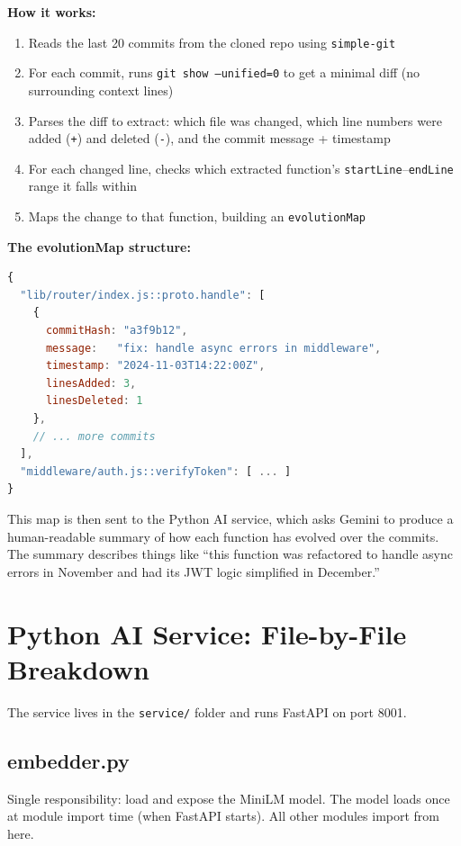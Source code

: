 \documentclass[a4paper,11pt]{article}
\begin{document}
\textbf{How it works:}
\begin{enumerate}
    \item Reads the last 20 commits from the cloned repo using \texttt{simple-git}
    \item For each commit, runs \texttt{git show --unified=0} to get a minimal diff (no surrounding context lines)
    \item Parses the diff to extract: which file was changed, which line numbers were added (\texttt{+}) and deleted (\texttt{-}), and the commit message + timestamp
    \item For each changed line, checks which extracted function's \texttt{startLine}--\texttt{endLine} range it falls within
    \item Maps the change to that function, building an \texttt{evolutionMap}
\end{enumerate}

\textbf{The evolutionMap structure:}
\begin{lstlisting}[language=JavaScript]
{
  "lib/router/index.js::proto.handle": [
    {
      commitHash: "a3f9b12",
      message:   "fix: handle async errors in middleware",
      timestamp: "2024-11-03T14:22:00Z",
      linesAdded: 3,
      linesDeleted: 1
    },
    // ... more commits
  ],
  "middleware/auth.js::verifyToken": [ ... ]
}
\end{lstlisting}

This map is then sent to the Python AI service, which asks Gemini to produce a human-readable summary of how each function has evolved over the commits. The summary describes things like ``this function was refactored to handle async errors in November and had its JWT logic simplified in December.''

\newpage

\section{Python AI Service: File-by-File Breakdown}

The service lives in the \texttt{service/} folder and runs FastAPI on port 8001.

\subsection{embedder.py}
Single responsibility: load and expose the MiniLM model. The model loads once at module import time (when FastAPI starts). All other modules import from here.
\end{document}
